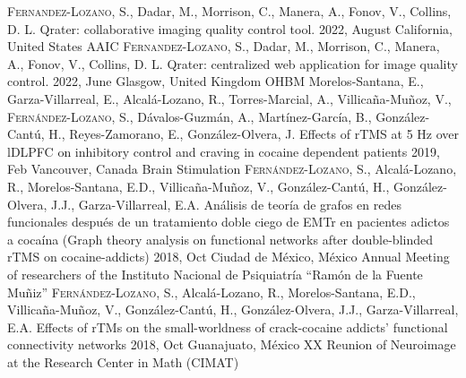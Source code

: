 {
\setlength\tabcolsep{0pt} \setlength{\extrarowheight}{0pt}%
\begin{itemize}[leftmargin=5ex, nosep, noitemsep, itemindent=-13pt,
    label=\raisebox{0.25ex}{\tiny$\bullet$}]%
    \vspace{-1.8mm}%
    \cvposter
        {{\scshape{Fernandez-Lozano, S.}}, Dadar, M., Morrison, C., Manera, A.,
        Fonov, V., Collins, D. L.}
        {Qrater: collaborative imaging quality control tool.}
        {2022, August}
        {California, United States}
        {AAIC}
    \cvposter
        {{\scshape{Fernandez-Lozano, S.}}, Dadar, M., Morrison, C., Manera, A.,
        Fonov, V., Collins, D. L.}
        {Qrater: centralized web application for image quality control.}
        {2022, June}
        {Glasgow, United Kingdom}
        {OHBM}
    \cvposter
        {Morelos-Santana, E., Garza-Villarreal, E., Alcalá-Lozano, R.,
          Torres-Marcial, A., Villicaña-Muñoz, V., {\scshape{Fernández-Lozano,
          S.}}, Dávalos-Guzmán, A., Martínez-García, B., González-Cantú, H.,
            Reyes-Zamorano, E., González-Olvera, J.}
        {Effects of rTMS at 5 Hz over lDLPFC on inhibitory control and craving
            in cocaine dependent patients}
        {2019, Feb}
        {Vancouver, Canada}
        {Brain Stimulation}
    \cvposter
        {{\scshape{Fernández-Lozano, S.}}, Alcalá-Lozano, R., Morelos-Santana, E.D.,
            Villicaña-Muñoz, V., González-Cantú, H., González-Olvera, J.J.,
        Garza-Villarreal, E.A.}
        {Análisis de teoría de grafos en redes funcionales después de un
            tratamiento doble ciego de EMTr en pacientes adictos a cocaína
            (Graph theory analysis on functional networks after double-blinded
        rTMS on cocaine-addicts)}
        {2018, Oct}
        {Ciudad de México, México}
        {Annual Meeting of researchers of the Instituto Nacional de Psiquiatría ``Ramón de la Fuente Muñiz''}
    \cvposter
        {{\scshape{Fernández-Lozano, S.}}, Alcalá-Lozano, R., Morelos-Santana, E.D.,
            Villicaña-Muñoz, V., González-Cantú, H., González-Olvera, J.J.,
        Garza-Villarreal, E.A.}
        {Effects of rTMs on the small-worldness of crack-cocaine addicts' functional connectivity networks}
        {2018, Oct}
        {Guanajuato, México}
        {XX Reunion of Neuroimage at the Research Center in Math (CIMAT)}
\end{itemize}
}

